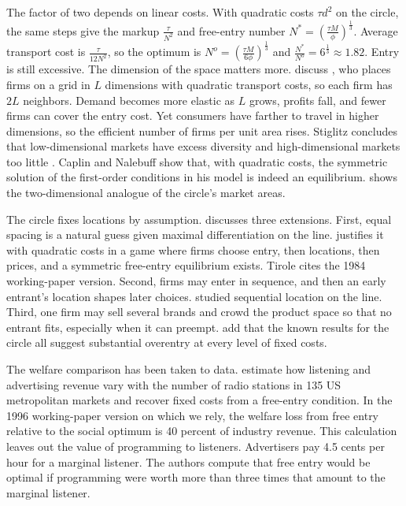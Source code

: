 The factor of two depends on linear costs. With quadratic costs $\tau d^2$ on the circle, the same steps give the
markup $\frac{\tau}{N^2}$ and free-entry number $N^* = (\frac{\tau M}{\phi})^{\frac{1}{3}}$. Average transport cost is
$\frac{\tau}{12N^2}$, so the optimum is $N^o = (\frac{\tau M}{6\phi})^{\frac{1}{3}}$ and $\frac{N^*}{N^o} = 6^{\frac{1}{3}} \approx 1.82$.
Entry is still excessive. The dimension of the space matters more.  discuss
\citet{Stiglitz1986}, who places firms on a grid in $L$ dimensions with quadratic transport costs, so each firm has
$2L$ neighbors. Demand becomes more elastic as $L$ grows, profits fall, and fewer firms can cover the entry cost.
Yet consumers have farther to travel in higher dimensions, so the efficient number of firms per unit area rises.
Stiglitz concludes that low-dimensional markets have excess diversity and high-dimensional markets too little
\citep[Section 8.3 and n.~21]{CaplinNalebuff1991}. Caplin and Nalebuff show that, with quadratic costs, the
symmetric solution of the first-order conditions in his model is indeed an equilibrium. 
shows the two-dimensional analogue of the circle's market areas.

The circle fixes locations by assumption.  discusses three extensions. First, equal
spacing is a natural guess given maximal differentiation on the line.  justifies it with
quadratic costs in a game where firms choose entry, then locations, then prices, and a symmetric free-entry
equilibrium exists. Tirole cites the 1984 working-paper version. Second, firms may enter in sequence, and then an
early entrant's location shapes later choices.  studied sequential location on the line.
Third, one firm may sell several brands and crowd the product space so that no entrant fits, especially when it can
preempt.  add that the known results for the circle all suggest
substantial overentry at every level of fixed costs.

The welfare comparison has been taken to data.  estimate how listening and advertising
revenue vary with the number of radio stations in 135 US metropolitan markets and recover fixed costs from a
free-entry condition. In the 1996 working-paper version on which we rely, the welfare loss from free entry relative
to the social optimum is 40 percent of industry revenue. This calculation leaves out the value of programming to
listeners. Advertisers pay 4.5 cents per hour for a marginal listener. The authors compute that free entry would be
optimal if programming were worth more than three times that amount to the marginal listener.


